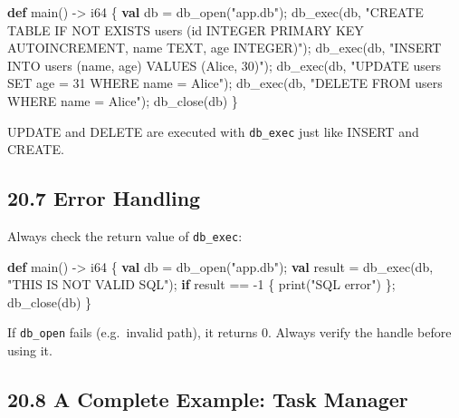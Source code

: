\documentclass[
  english,
]{book}
\newenvironment{Shaded}{\begin{snugshade}}{\end{snugshade}}
\newcommand{\ControlFlowTok}[1]{\textcolor[rgb]{0.77,0.53,0.75}{\textbf{#1}}}
\newcommand{\DataTypeTok}[1]{\textcolor[rgb]{0.31,0.79,0.69}{#1}}
\newcommand{\DecValTok}[1]{\textcolor[rgb]{0.71,0.81,0.66}{#1}}
\newcommand{\FunctionTok}[1]{\textcolor[rgb]{0.86,0.86,0.67}{#1}}
\newcommand{\KeywordTok}[1]{\textcolor[rgb]{0.34,0.61,0.84}{\textbf{#1}}}
\newcommand{\NormalTok}[1]{\textcolor[rgb]{0.83,0.83,0.83}{#1}}
\newcommand{\OperatorTok}[1]{\textcolor[rgb]{0.83,0.83,0.83}{#1}}
\newcommand{\StringTok}[1]{\textcolor[rgb]{0.81,0.57,0.47}{#1}}
\begin{document}
\begin{Shaded}
\begin{Highlighting}[]
\KeywordTok{def}\NormalTok{ main() }\OperatorTok{{-}\textgreater{}} \DataTypeTok{i64}\NormalTok{ \{}
    \KeywordTok{val}\NormalTok{ db }\OperatorTok{=}\NormalTok{ db\_open(}\StringTok{"app.db"}\NormalTok{);}
\NormalTok{    db\_exec(db, }\StringTok{"CREATE TABLE IF NOT EXISTS users (id INTEGER PRIMARY KEY AUTOINCREMENT, name TEXT, age INTEGER)"}\NormalTok{);}
\NormalTok{    db\_exec(db, }\StringTok{"INSERT INTO users (name, age) VALUES (\textquotesingle{}Alice\textquotesingle{}, 30)"}\NormalTok{);}
\NormalTok{    db\_exec(db, }\StringTok{"UPDATE users SET age = 31 WHERE name = \textquotesingle{}Alice\textquotesingle{}"}\NormalTok{);}
\NormalTok{    db\_exec(db, }\StringTok{"DELETE FROM users WHERE name = \textquotesingle{}Alice\textquotesingle{}"}\NormalTok{);}
\NormalTok{    db\_close(db)}
\NormalTok{\}}
\end{Highlighting}
\end{Shaded}

UPDATE and DELETE are executed with \texttt{db\_exec} just like INSERT
and CREATE.

\subsection{20.7 Error Handling}\label{error-handling}

Always check the return value of \texttt{db\_exec}:

\begin{Shaded}
\begin{Highlighting}[]
\KeywordTok{def}\NormalTok{ main() }\OperatorTok{{-}\textgreater{}} \DataTypeTok{i64}\NormalTok{ \{}
    \KeywordTok{val}\NormalTok{ db }\OperatorTok{=}\NormalTok{ db\_open(}\StringTok{"app.db"}\NormalTok{);}
    \KeywordTok{val} \DataTypeTok{result} \OperatorTok{=}\NormalTok{ db\_exec(db, }\StringTok{"THIS IS NOT VALID SQL"}\NormalTok{);}
    \ControlFlowTok{if} \DataTypeTok{result} \OperatorTok{==} \OperatorTok{{-}}\DecValTok{1}\NormalTok{ \{}
        \FunctionTok{print}\NormalTok{(}\StringTok{"SQL error"}\NormalTok{)}
\NormalTok{    \};}
\NormalTok{    db\_close(db)}
\NormalTok{\}}
\end{Highlighting}
\end{Shaded}

If \texttt{db\_open} fails (e.g.~invalid path), it returns 0. Always
verify the handle before using it.

\subsection{20.8 A Complete Example: Task
Manager}\label{a-complete-example-task-manager}
\end{document}
